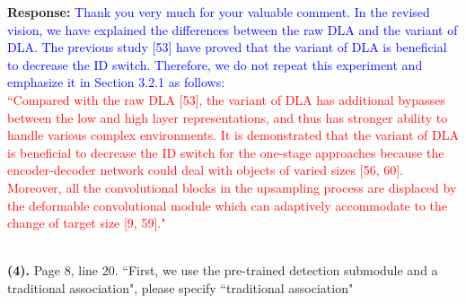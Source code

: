\documentclass[12pt,journal,onecolumn]{IEEEtran}
\begin{document}
\textbf{Response:} \textcolor{blue}{Thank you very much for your valuable comment. 
In the revised vision, we have explained the differences between the raw DLA and the variant of DLA.
The previous study [53] have proved that the variant of DLA is beneficial to decrease the ID switch.
Therefore, we do not repeat this experiment and emphasize it in Section 3.2.1 as follows:
} \\
\textcolor{red}{
``Compared with the raw DLA [53], the variant of DLA has additional bypasses between the low and high layer representations,
and thus has stronger ability to handle various complex environments.
It is demonstrated that the variant of DLA is beneficial to decrease the ID switch for the one-stage approaches because the encoder-decoder network could deal with objects of varied sizes [56, 60].
Moreover, all the convolutional blocks in the upsampling process are displaced by the deformable convolutional module which can adaptively accommodate to the change of target size [9, 59]."
}
\\ \\
\vspace{8pt}


\textbf{(4).} Page 8, line 20. ``First, we use the pre-trained detection submodule and a traditional association", please specify ``traditional association"
\end{document}

